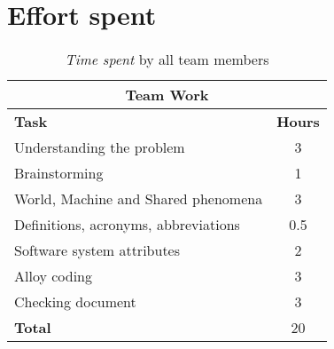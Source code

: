 \documentclass[../RASD.tex]{subfiles}
\begin{document}
    \chapter{Effort spent}\label{ch:effort-spent}
    \begin{table}[h]
        \centering
        \begin{tabular}{l c}
            \hline\hline
            \multicolumn{2}{c}{\textbf{Team Work}} \\
            \hline
            \textbf{Task} & \textbf{Hours} \\ [0.5ex]
            \hline
            Understanding the problem & 3  \\
            Brainstorming & 1 \\
            World, Machine and Shared phenomena & 3 \\
            Definitions, acronyms, abbreviations & 0.5  \\
            Software system attributes & 2 \\
            Alloy coding & 3 \\
            Checking document  & 3  \\
            \hline
            \textbf{Total} & 20  \\
            \hline
        \end{tabular}
        \caption{\textit{Time spent} by all team members}
        \label{fig:Time spent by all team members}
    \end{table}
\end{document}
